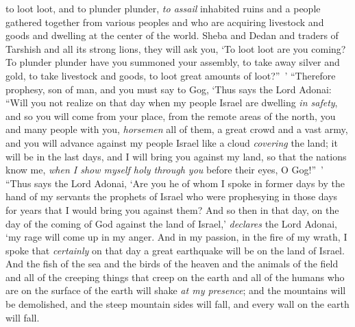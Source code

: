 \begin{biblechapter}
\verse to loot loot, and to plunder plunder, \textit{to assail} inhabited ruins and a people gathered together from various peoples and who are acquiring livestock and goods and dwelling at the center of the world.
\verse Sheba and Dedan and traders of Tarshish and all its strong lions, they will ask you, ‘To loot loot are you coming? To plunder plunder have you summoned your assembly, to take away silver and gold, to take livestock and goods, to loot great amounts of loot?” ’
\verse “Therefore prophesy, son of man, and you must say to Gog, ‘Thus says the Lord Adonai: “Will you not realize on that day when my people Israel are dwelling \textit{in safety},
\verse and so you will come from your place, from the remote areas of the north, you and many people with you, \textit{horsemen} all of them, a great crowd and a vast army,
\verse and you will advance against my people Israel like a cloud \textit{covering} the land; it will be in the last days, and I will bring you against my land, so that the nations know me, \textit{when I show myself holy through you} before their eyes, O Gog!” ’
\verse “Thus says the Lord Adonai, ‘Are you he of whom I spoke in former days by the hand of my servants the prophets of Israel who were prophesying in those days for years that I would bring you against them?
\verse And so then in that day, on the day of the coming of God against the land of Israel,’ \textit{declares} the Lord Adonai, ‘my rage will come up in my anger.
\verse And in my passion, in the fire of my wrath, I spoke that \textit{certainly} on that day a great earthquake will be on the land of Israel.
\verse And the fish of the sea and the birds of the heaven and the animals of the field and all of the creeping things that creep on the earth and all of the humans who are on the surface of the earth will shake \textit{at my presence}; and the mountains will be demolished, and the steep mountain sides will fall, and every wall on the earth will fall.

\end{biblechapter}
